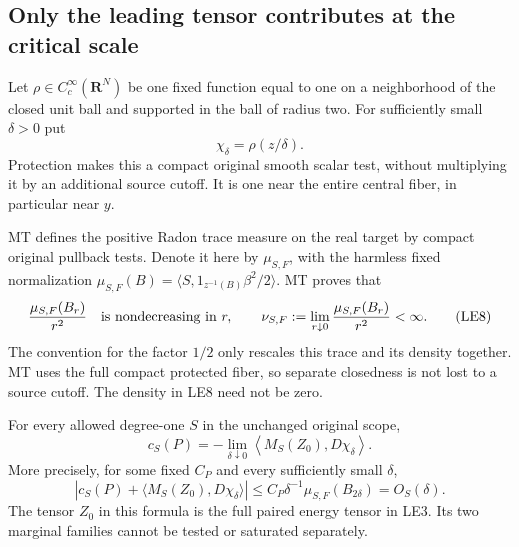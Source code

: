 \subsection{Only the leading tensor contributes at the critical scale}

Let $\rho\in C_c^\infty(\mathbf R^N)$ be one fixed function
equal to one on a neighborhood of the closed unit ball and
supported in the ball of radius two.  For sufficiently small
$\delta>0$ put
\[
                  \chi_\delta=\rho(z/\delta).
 \tag{LE7}
\]
Protection makes this a compact original smooth scalar test,
without multiplying it by an additional source cutoff.  It is
one near the entire central fiber, in particular near $y$.

MT defines the positive Radon trace measure on the real target
by compact original pullback tests.  Denote it here by
$\mu_{S,F}$, with the harmless fixed normalization
$\mu_{S,F}(B)=\langle S,1_{z^{-1}(B)}\beta^2/2\rangle$.
MT proves that
\[
       \frac{\mu_{S,F}(B_r)}{r^2}\quad\hbox{is nondecreasing
       in }r,
       \qquad
       \nu_{S,F}:=\lim_{r\downarrow0}
                       \frac{\mu_{S,F}(B_r)}{r^2}<\infty.
 \tag{LE8}
\]
The convention for the factor $1/2$ only rescales this trace
and its density together.  MT uses the full compact protected
fiber, so separate closedness is not lost to a source cutoff.
The density in LE8 need not be zero.

\begin{theorem}
\label{thm:r13-leading-energy-residual}
For every allowed degree-one $S$ in the unchanged original
scope,
\[
 c_S(P)=-\lim_{\delta\downarrow0}
           \left\langle M_S(Z_0),D\chi_\delta\right\rangle.
 \tag{LE9}
\]
More precisely, for some fixed $C_P$ and every sufficiently
small $\delta$,
\[
 \left|c_S(P)+\langle M_S(Z_0),D\chi_\delta\rangle\right|
       \le C_P\delta^{-1}\mu_{S,F}(B_{2\delta})=O_S(\delta).
 \tag{LE10}
\]
The tensor $Z_0$ in this formula is the full paired energy
tensor in LE3.  Its two marginal families cannot be tested
or saturated separately.
\end{theorem}

